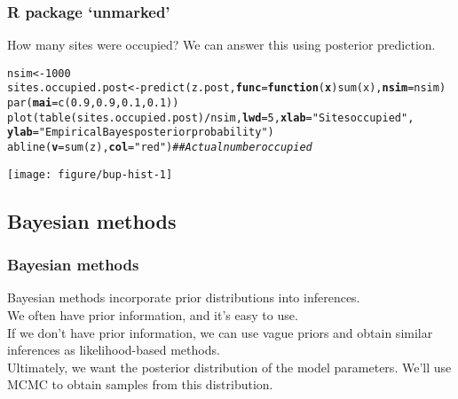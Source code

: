 \documentclass[color=usenames,dvipsnames]{beamer}\usepackage[]{graphicx}\usepackage[]{color}
\makeatletter
\newcommand{\hlnum}[1]{\textcolor[rgb]{0.69,0.494,0}{#1}}%
\newcommand{\hlstr}[1]{\textcolor[rgb]{0.749,0.012,0.012}{#1}}%
\newcommand{\hlcom}[1]{\textcolor[rgb]{0.514,0.506,0.514}{\textit{#1}}}%
\newcommand{\hlopt}[1]{\textcolor[rgb]{0,0,0}{#1}}%
\newcommand{\hlstd}[1]{\textcolor[rgb]{0,0,0}{#1}}%
\newcommand{\hlkwa}[1]{\textcolor[rgb]{0,0,0}{\textbf{#1}}}%
\newcommand{\hlkwb}[1]{\textcolor[rgb]{0,0.341,0.682}{#1}}%
\newcommand{\hlkwc}[1]{\textcolor[rgb]{0,0,0}{\textbf{#1}}}%
\newcommand{\hlkwd}[1]{\textcolor[rgb]{0.004,0.004,0.506}{#1}}%
\newenvironment{kframe}{%
 \def\at@end@of@kframe{}%
 \ifinner\ifhmode%
  \def\at@end@of@kframe{\end{minipage}}%
  \begin{minipage}{\columnwidth}%
 \fi\fi%
 \def\FrameCommand##1{\hskip\@totalleftmargin \hskip-\fboxsep
 \colorbox{shadecolor}{##1}\hskip-\fboxsep
     \hskip-\linewidth \hskip-\@totalleftmargin \hskip\columnwidth}%
 \MakeFramed {\advance\hsize-\width
   \@totalleftmargin\z@ \linewidth\hsize
   \@setminipage}}%
 {\par\unskip\endMakeFramed%
 \at@end@of@kframe}
\newenvironment{knitrout}{}{} %
\makeatother
\begin{document}
\begin{frame}[fragile]
  \frametitle{R package `unmarked'}
  How many sites were occupied? \pause
  We can answer this using posterior prediction.
\begin{knitrout}\tiny
{}\color{fgcolor}\begin{kframe}
\begin{alltt}
\hlstd{nsim} \hlkwb{<-} \hlnum{1000}
\hlstd{sites.occupied.post} \hlkwb{<-} \hlkwd{predict}\hlstd{(z.post,} \hlkwc{func}\hlstd{=}\hlkwa{function}\hlstd{(}\hlkwc{x}\hlstd{)} \hlkwd{sum}\hlstd{(x),} \hlkwc{nsim}\hlstd{=nsim)}
\hlkwd{par}\hlstd{(}\hlkwc{mai}\hlstd{=}\hlkwd{c}\hlstd{(}\hlnum{0.9}\hlstd{,}\hlnum{0.9}\hlstd{,}\hlnum{0.1}\hlstd{,}\hlnum{0.1}\hlstd{))}
\hlkwd{plot}\hlstd{(}\hlkwd{table}\hlstd{(sites.occupied.post)}\hlopt{/}\hlstd{nsim,} \hlkwc{lwd}\hlstd{=}\hlnum{5}\hlstd{,} \hlkwc{xlab}\hlstd{=}\hlstr{"Sites occupied"}\hlstd{,}
    \hlkwc{ylab}\hlstd{=}\hlstr{"Empirical Bayes posterior probability"}\hlstd{)}
\hlkwd{abline}\hlstd{(}\hlkwc{v}\hlstd{=}\hlkwd{sum}\hlstd{(z),} \hlkwc{col}\hlstd{=}\hlstr{"red"}\hlstd{)} \hlcom{## Actual number occupied}
\end{alltt}
\end{kframe}

{\centering \texttt{[image: figure/bup-hist-1]} 

}


\end{knitrout}
\end{frame}



\subsection{Bayesian methods}


\begin{frame}
  \frametitle{Bayesian methods}
  Bayesian methods incorporate prior distributions into inferences. \\
  \pause
  \vfill
  We often have prior information, and it's easy to use. \\
  \pause
  \vfill
  If we don't have prior information, we can use vague priors and
  obtain similar inferences as likelihood-based methods. \\
  \pause
  \vfill
  Ultimately, we want the posterior distribution of the model
  parameters. We'll use MCMC to obtain samples from this
  distribution. 
\end{frame}
\end{document}
